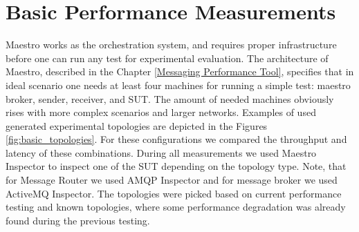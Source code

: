 \section{Basic Performance Measurements}
\label{Basic Performance Measurements}
Maestro works as the orchestration system, and requires proper infrastructure before one can run any test for experimental evaluation. The architecture of Maestro, described in the Chapter \ref{Messaging Performance Tool}, specifies that in ideal scenario one needs at least four machines for running a simple test: maestro broker, sender, receiver, and SUT. The amount of needed machines obviously rises with more complex scenarios and larger networks. Examples of used generated experimental topologies are depicted in the Figures \ref{fig:basic_topologies}. For these configurations we compared the throughput and latency of these combinations. During all measurements we used Maestro Inspector to inspect one of the SUT depending on the topology type. Note, that for Message Router we used AMQP Inspector and for message broker we used ActiveMQ Inspector. The topologies were picked based on current performance testing and known topologies, where some performance degradation was already found during the previous testing.

